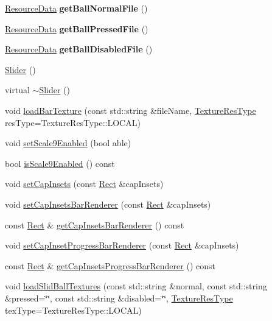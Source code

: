 \begin{DoxyCompactItemize}
\hyperlink{structResourceData}{Resource\+Data} {\bfseries get\+Ball\+Normal\+File} ()
\item 
\mbox{\label{classui_1_1Slider_aea0d8623383344a046e001127929dbc8}} 
\hyperlink{structResourceData}{Resource\+Data} {\bfseries get\+Ball\+Pressed\+File} ()
\item 
\mbox{\label{classui_1_1Slider_a4aec4902fc6ca4a51b9af831dbb310de}} 
\hyperlink{structResourceData}{Resource\+Data} {\bfseries get\+Ball\+Disabled\+File} ()
\item 
\hyperlink{classui_1_1Slider_ac4d871719e4de62907d10551f34a36f3}{Slider} ()
\item 
virtual \hyperlink{classui_1_1Slider_ab68ac1e31c69b3959203174c574b83ee}{$\sim$\+Slider} ()
\item 
void \hyperlink{classui_1_1Slider_a20859a6757a6d477d307e8b70de15805}{load\+Bar\+Texture} (const std\+::string \&file\+Name, \hyperlink{classui_1_1Widget_a040a65ec5ad3b11119b7e16b98bd9af0}{Texture\+Res\+Type} res\+Type=Texture\+Res\+Type\+::\+L\+O\+C\+AL)
\item 
void \hyperlink{classui_1_1Slider_a5bde7358258d6ad46027d92dd0bfa2ca}{set\+Scale9\+Enabled} (bool able)
\item 
bool \hyperlink{classui_1_1Slider_ade445792dc967b0556309956621f787a}{is\+Scale9\+Enabled} () const
\item 
void \hyperlink{classui_1_1Slider_a4b2b8f333375075f9b05f81f2195b52b}{set\+Cap\+Insets} (const \hyperlink{classRect}{Rect} \&cap\+Insets)
\item 
void \hyperlink{classui_1_1Slider_ae0ee53b2a1e339478674a20004f3c26d}{set\+Cap\+Insets\+Bar\+Renderer} (const \hyperlink{classRect}{Rect} \&cap\+Insets)
\item 
const \hyperlink{classRect}{Rect} \& \hyperlink{classui_1_1Slider_a9b50003f59b9527d73eea296e7d23de8}{get\+Cap\+Insets\+Bar\+Renderer} () const
\item 
void \hyperlink{classui_1_1Slider_a842f741bea3f683a5d045cd46e457d36}{set\+Cap\+Inset\+Progress\+Bar\+Renderer} (const \hyperlink{classRect}{Rect} \&cap\+Insets)
\item 
const \hyperlink{classRect}{Rect} \& \hyperlink{classui_1_1Slider_a77f08827e7585200f40eb34bbc9fedd9}{get\+Cap\+Insets\+Progress\+Bar\+Renderer} () const
\item 
void \hyperlink{classui_1_1Slider_a8bdbd4777a5635376fd5fe205968c247}{load\+Slid\+Ball\+Textures} (const std\+::string \&normal, const std\+::string \&pressed=\char`\"{}\char`\"{}, const std\+::string \&disabled=\char`\"{}\char`\"{}, \hyperlink{classui_1_1Widget_a040a65ec5ad3b11119b7e16b98bd9af0}{Texture\+Res\+Type} tex\+Type=Texture\+Res\+Type\+::\+L\+O\+C\+AL)

\end{DoxyCompactItemize}
